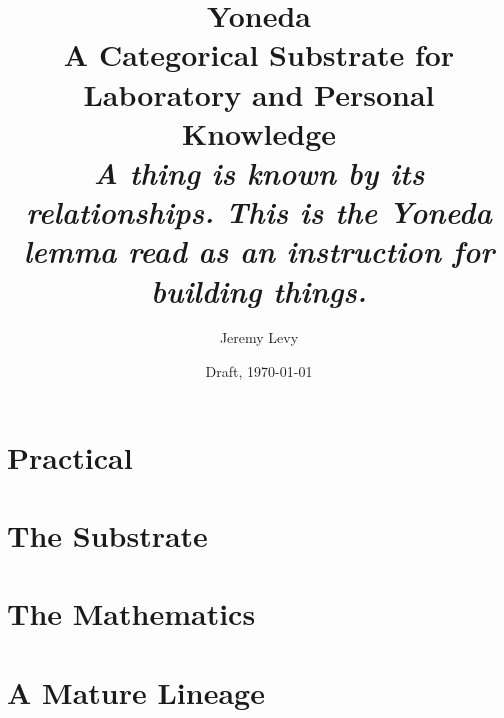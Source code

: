 \documentclass[11pt,openany]{book}
\title{\Huge Yoneda\\[0.4em]\Large A Categorical Substrate for Laboratory and Personal Knowledge\\[0.8em]
\normalsize\textit{A thing is known by its relationships. This is the Yoneda lemma read as an instruction for building things.}}
\author{Jeremy Levy}
\date{Draft, \today}
\begin{document}
\frontmatter
\maketitle

\tableofcontents



\mainmatter

\part{Practical}







\part{The Substrate}







\part{The Mathematics}







\part{A Mature Lineage}


\backmatter
% 
% 
\end{document}

